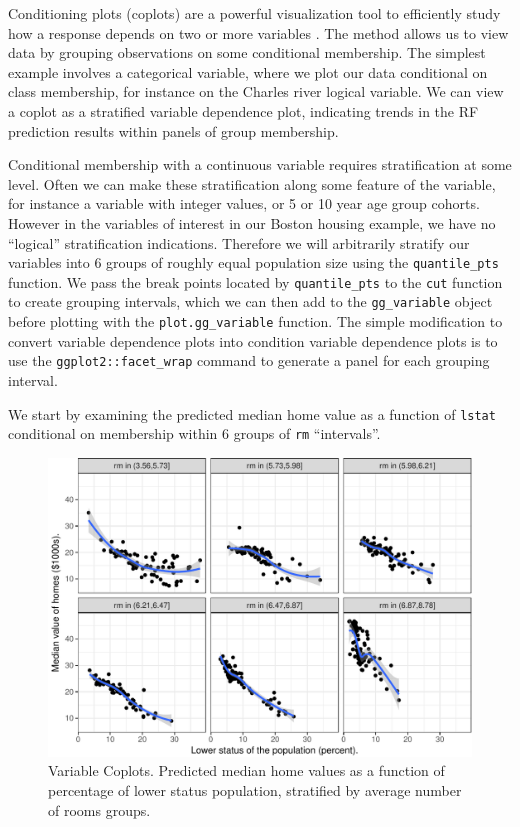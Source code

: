 \documentclass[article]{jss}
\begin{document}
Conditioning plots (coplots)
\citep[\citet{cleveland:1993}]{chambers:1992} are a powerful
visualization tool to efficiently study how a response depends on two or
more variables \citep{cleveland:1993}. The method allows us to view data
by grouping observations on some conditional membership. The simplest
example involves a categorical variable, where we plot our data
conditional on class membership, for instance on the Charles river
logical variable. We can view a coplot as a stratified variable
dependence plot, indicating trends in the RF prediction results within
panels of group membership.

Conditional membership with a continuous variable requires
stratification at some level. Often we can make these stratification
along some feature of the variable, for instance a variable with integer
values, or 5 or 10 year age group cohorts. However in the variables of
interest in our Boston housing example, we have no ``logical''
stratification indications. Therefore we will arbitrarily stratify our
variables into 6 groups of roughly equal population size using the
\texttt{quantile\_pts} function. We pass the break points located by
\texttt{quantile\_pts} to the \texttt{cut} function to create grouping
intervals, which we can then add to the \texttt{gg\_variable} object
before plotting with the \texttt{plot.gg\_variable} function. The simple
modification to convert variable dependence plots into condition
variable dependence plots is to use the \texttt{ggplot2::facet\_wrap}
command to generate a panel for each grouping interval.

We start by examining the predicted median home value as a function of
\texttt{lstat} conditional on membership within 6 groups of \texttt{rm}
``intervals''.

\begin{CodeChunk}
\begin{figure}

{\centering \includegraphics{Regression-rfsrc_files/figure-latex/coplots-1} 

}

\caption[Variable Coplots]{Variable Coplots. Predicted median home values as a function of percentage of lower status population, stratified by average number of rooms groups.}\label{fig:coplots}
\end{figure}
\end{CodeChunk}
\end{document}
